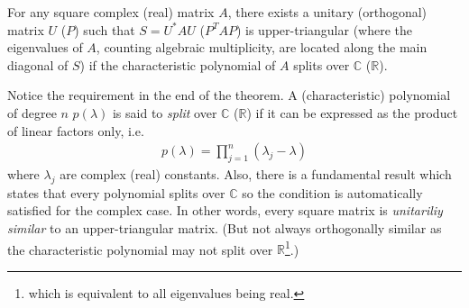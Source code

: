 \begin{thm}
\label{thm:schurtrig}
For any square complex (real) matrix $A$, there exists a unitary (orthogonal) matrix $U$ ($P$) such that $S = U^*AU$ ($P^TAP$) is upper-triangular (where the eigenvalues of $A$, counting algebraic multiplicity, are located along the main diagonal of $S$) if the characteristic polynomial of $A$ splits over $\mathbb{C}$ ($\mathbb{R}$).
\end{thm}
Notice the requirement in the end of the theorem. A (characteristic) polynomial of degree $n$ $p(\lambda)$ is said to \textit{split} over $\mathbb{C}$ ($\mathbb{R}$) if it can be expressed as the product of linear factors only, i.e.
\begin{align*}
p(\lambda) = \prod_{j=1}^n (\lambda_j - \lambda)    
\end{align*}
where $\lambda_j$ are complex (real) constants. Also, there is a fundamental result which states that every polynomial splits over $\mathbb{C}$ so the condition is automatically satisfied for the complex case. In other words, every square matrix is \textit{unitariliy similar} to an upper-triangular matrix. (But not always orthogonally similar as the characteristic polynomial may not split over $\mathbb{R}$\footnote{which is equivalent to all eigenvalues being real.}.)
